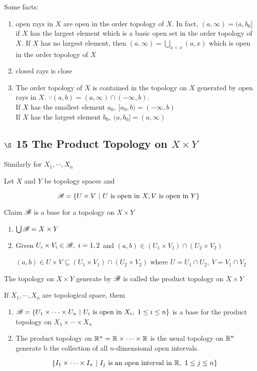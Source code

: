 Some facts:

\begin{enumerate}
	\item open rays in $X$ are open in the order topology of $X$. In fact, $(a,\infty) = (a,b_0]$ if $X$ has the largest element which is a basic open set in the order topology of $X$. If $X$ has no largest element, then $(a,\infty) = \bigcup_{a < x}(a,x)$ which is open in the order topology of $X$
	\item closed rays is close
	\item The order topology of $X$ is contained in the topology on $X$ generated by open rays in $X$. $\because (a,b) = (a,\infty) \cap (-\infty,b)$. \\
	If $X$ has the smallest element $a_0,~ [a_0,b) = (-\infty,b)$\\
	If $X$ has the largest element $b_0,~(a,b_0] = (a,\infty)$
\end{enumerate}

\subsection*{$\S$ 15 The Product Topology on $X \times Y$}

Similarly for $X_1,\cdots, X_n$

Let $X$ and $Y$ be topology spaces and 

$$\mathscr{B} = \{U \times V ~|~ U \text{ is open in } X,V \text{ is open in } Y\}$$

Claim $\mathscr{B}$ is a base for a topology on $X \times Y$

\begin{enumerate}[label = $\bullet$]
	\item $\bigcup \mathscr{B} = X \times Y$
	\item Given $U_i \times V_i \in \mathscr{B},~i=1,2$ and $(a,b) \in (U_1 \times V_1) \cap (U_2 \times V_2)$
	
	$(a,b) \in U \times V \subseteq (U_1 \times V_1) \cap (U_2 \times V_2)$ where $U = U_1 \cap U_2,~V = V_1 \cap V_2$
\end{enumerate}

\begin{defn}
	The topology on $X \times Y$ generate by $\mathscr{B}$ is called the product topology on $X \times Y$
\end{defn}

\begin{rmk*}
	If $X_1,\cdots,X_n$ are topological space, them
	
	\begin{enumerate}
		\item $\mathscr{B} = \{U_1 \times \cdots \times U_n ~|~ U_i \text{ is open in }X_i,~1\leq i \leq n\}$ is a base for the product topology on $X_1 \times \cdots \times X_n$
		\item The product topology on $\mathbb{R}^n = \mathbb{R} \times \cdots \times \mathbb{R}$ is the usual topology on $\mathbb{R}^n$ generate b the collection of all $n$-dimensional open intervals.
		
		$$\{I_1 \times \cdots \times I_n ~|~ I_j \text{ is an open interval in }\mathbb{R},~1 \leq j \leq n\}$$
	\end{enumerate}
\end{rmk*}


